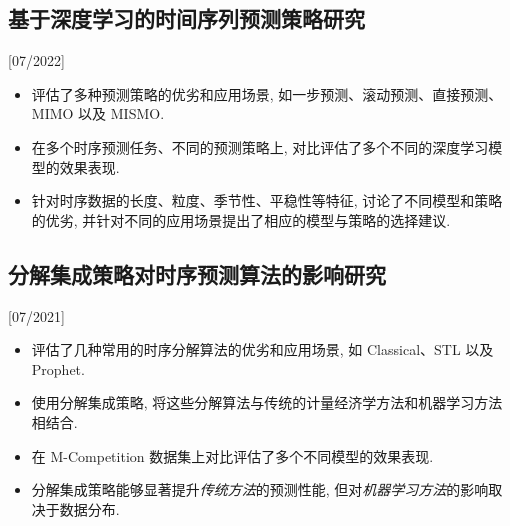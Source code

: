 \documentclass{mycv}
\begin{document}
\vspace{-\parskip}

\subsection{基于深度学习的时间序列预测策略研究}[07/2022]

\begin{itemize}
  \item 评估了多种预测策略的优劣和应用场景, 如一步预测、滚动预测、直接预测、MIMO 以及 MISMO.
  \item 在多个时序预测任务、不同的预测策略上, 对比评估了多个不同的深度学习模型的效果表现.
  \item 针对时序数据的长度、粒度、季节性、平稳性等特征, 讨论了不同模型和策略的优劣, 并针对不同的应用场景提出了相应的模型与策略的选择建议.
\end{itemize}

\vspace{-\parskip}

\subsection{分解集成策略对时序预测算法的影响研究}[07/2021]

\begin{itemize}
  \item 评估了几种常用的时序分解算法的优劣和应用场景, 如 Classical、STL 以及 Prophet.
  \item 使用分解集成策略, 将这些分解算法与传统的计量经济学方法和机器学习方法相结合.
  \item 在 M-Competition 数据集上对比评估了多个不同模型的效果表现.
  \item 分解集成策略能够显著提升\textit{传统方法}的预测性能, 但对\textit{机器学习方法}的影响取决于数据分布.
\end{itemize}


\end{document}
